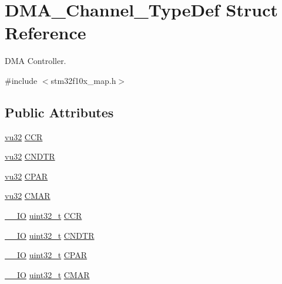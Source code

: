 \hypertarget{struct_d_m_a___channel___type_def}{}\section{D\+M\+A\+\_\+\+Channel\+\_\+\+Type\+Def Struct Reference}
\label{struct_d_m_a___channel___type_def}


D\+MA Controller.  




{\ttfamily \#include $<$stm32f10x\+\_\+map.\+h$>$}

\subsection*{Public Attributes}
\begin{DoxyCompactItemize}
\item 
\hyperlink{agilefox_2library_2inc_2stm32f10x__type_8h_a6e2761f0a1011f84ed96b946f2c8a563}{vu32} \hyperlink{struct_d_m_a___channel___type_def_a712f469f4ab2eeb84ed6461626f3a00f}{C\+CR}
\item 
\hyperlink{agilefox_2library_2inc_2stm32f10x__type_8h_a6e2761f0a1011f84ed96b946f2c8a563}{vu32} \hyperlink{struct_d_m_a___channel___type_def_a0c337fc15ad3374cd70e814afa0b2926}{C\+N\+D\+TR}
\item 
\hyperlink{agilefox_2library_2inc_2stm32f10x__type_8h_a6e2761f0a1011f84ed96b946f2c8a563}{vu32} \hyperlink{struct_d_m_a___channel___type_def_a9048b83bbc6d2dea62503b6e334257be}{C\+P\+AR}
\item 
\hyperlink{agilefox_2library_2inc_2stm32f10x__type_8h_a6e2761f0a1011f84ed96b946f2c8a563}{vu32} \hyperlink{struct_d_m_a___channel___type_def_af2045b3622ed681023099f802c4756b4}{C\+M\+AR}
\item 
\hyperlink{group___c_m_s_i_s___c_m3__core__definitions_gaec43007d9998a0a0e01faede4133d6be}{\+\_\+\+\_\+\+IO} \hyperlink{_p_e___types_8h_a33594304e786b158f3fb30289278f5af}{uint32\+\_\+t} \hyperlink{struct_d_m_a___channel___type_def_aa4938d438293f76ff6d9a262715c23eb}{C\+CR}
\item 
\hyperlink{group___c_m_s_i_s___c_m3__core__definitions_gaec43007d9998a0a0e01faede4133d6be}{\+\_\+\+\_\+\+IO} \hyperlink{_p_e___types_8h_a33594304e786b158f3fb30289278f5af}{uint32\+\_\+t} \hyperlink{struct_d_m_a___channel___type_def_af1c675e412fb96e38b6b4630b88c5676}{C\+N\+D\+TR}
\item 
\hyperlink{group___c_m_s_i_s___c_m3__core__definitions_gaec43007d9998a0a0e01faede4133d6be}{\+\_\+\+\_\+\+IO} \hyperlink{_p_e___types_8h_a33594304e786b158f3fb30289278f5af}{uint32\+\_\+t} \hyperlink{struct_d_m_a___channel___type_def_a8ce1c9c2742eaaa0e97ddbb3a06154cc}{C\+P\+AR}
\item 
\hyperlink{group___c_m_s_i_s___c_m3__core__definitions_gaec43007d9998a0a0e01faede4133d6be}{\+\_\+\+\_\+\+IO} \hyperlink{_p_e___types_8h_a33594304e786b158f3fb30289278f5af}{uint32\+\_\+t} \hyperlink{struct_d_m_a___channel___type_def_a7a9886b5f9e0edaf5ced3d1870b33ad7}{C\+M\+AR}
\end{DoxyCompactItemize}


